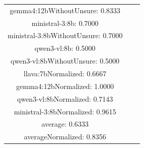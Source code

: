 \documentclass[a4paper]{article}
\begin{document}
\begin{tabular}{ccc}
gemma4:12bWithoutUnsure: 0.8333 \\ ministral-3:8b: 0.7000 \\ ministral-3:8bWithoutUnsure: 0.7000 \\ qwen3-vl:8b: 0.5000 \\ qwen3-vl:8bWithoutUnsure: 0.5000 \\ llava:7bNormalized: 0.6667 \\ gemma4:12bNormalized: 1.0000 \\ qwen3-vl:8bNormalized: 0.7143 \\ ministral-3:8bNormalized: 0.9615 \\ average: 0.6333 \\ averageNormalized: 0.8356 \end{minipage}\\
\end{tabular}

\vspace{5mm}
\end{document}
